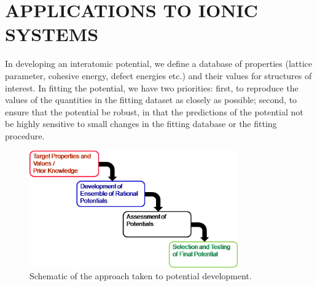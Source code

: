 \chapter{APPLICATIONS TO IONIC SYSTEMS}
\label{ch:ionic_MgO}

In developing an interatomic potential, we define a database of properties (lattice parameter, cohesive energy, defect energies etc.) and their values for structures of interest. In fitting the potential, we have two priorities: first, to reproduce the values of the quantities in the fitting dataset as closely as possible; second, to ensure that the potential be robust, in that the predictions of the potential not be highly sensitive to small changes in the fitting database or the fitting procedure.

\begin{figure}[h]
	\centering
  \includegraphics[width=0.8\textwidth]{chapter7/pareto_schematic}
  \caption{Schematic of the approach taken to potential development.}
  \label{fig:pareto_schematic}
\end{figure}

